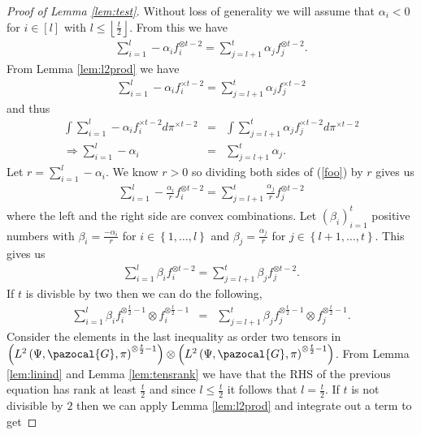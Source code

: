 \documentclass[aos]{imsart}
\def\l{\left}
\def\r{\right}
\def\sG{\pazocal{G}}
\theoremstyle{plain}
\theoremstyle{defintion}
\begin{document}
\begin{proof}[Proof of Lemma \ref{lem:test}]
		Without loss of generality we will assume that $\alpha_i<0$ for $i\in \left[ l \right]$ with $l\le \l\lfloor \frac{t}{2}\r\rfloor$. From this we have 
		\begin{eqnarray}\label{foo}
			\sum_{i=1}^{l}-\alpha_i f_i^{\otimes t-2}=\sum_{j=l+1}^{t}\alpha_j f_j^{\otimes t-2}.
		\end{eqnarray}
		From Lemma \ref{lem:l2prod} we have
		\begin{eqnarray*}
			\sum_{i=1}^{l}-\alpha_i f_i^{\times t-2}=\sum_{j=l+1}^{t}\alpha_j f_j^{\times t-2}
		\end{eqnarray*}
		and thus
		\begin{eqnarray*}
			\int \sum_{i=1}^{l}-\alpha_i f_i^{\times t-2} d\pi^{\times t-2 }&=&\int \sum_{j=l+1}^{t}\alpha_j f_j^{\times t-2}d\pi^{\times t-2 }\\
			\Rightarrow \sum_{i=1}^{l}-\alpha_i &=&\sum_{j=l+1}^{t}\alpha_j.
		\end{eqnarray*}
		Let $r=\sum_{i=1}^{l}-\alpha_i$. We know $r >0$ so dividing both sides of (\ref{foo}) by $r$ gives us
		\begin{eqnarray*}
			\sum_{i=1}^{l}-\frac{\alpha_i}{r} f_i^{\otimes t-2}=\sum_{j=l+1}^{t}\frac{\alpha_j}{r} f_j^{\otimes t-2}
		\end{eqnarray*}
		where the left and the right side are convex combinations. Let $\left( \beta_i \right)_{i=1}^{t}$ positive numbers with $\beta_i = \frac{-\alpha_i}{r}$ for $i \in \left\{ 1,\ldots,l \right\}$ and $\beta_j = \frac{\alpha_j}{r}$ for $j\in \left\{ l+1,\ldots,t \right\}$. This gives us
		\begin{eqnarray*}
			\sum_{i=1}^{l}\beta_i f_i^{\otimes t-2}=\sum_{j=l+1}^{t}\beta_j f_j^{\otimes t-2}.
		\end{eqnarray*}
		If $t$ is divisble by two then we can do the following,
		\begin{eqnarray*}
			\sum_{i=1}^{l} \beta_i f_i^{\otimes \frac{t}{2}-1}\otimes f_i^{\otimes \frac{t}{2}-1}&=&\sum_{j=l+1}^{t}\beta_j f_j^{\otimes \frac{t}{2}-1}\otimes f_j^{\otimes \frac{t}{2}-1}.
		\end{eqnarray*}
		Consider the elements in the last inequality as order two tensors in $\left( {L^2\left( \Psi, \sG, \pi \right)}^{\otimes \frac{t}{2}-1} \right)\otimes \left( {L^2\left( \Psi, \sG, \pi \right)}^{ \otimes \frac{t}{2}-1} \right)$. From Lemma \ref{lem:linind} and Lemma \ref{lem:tensrank} we have that the RHS of the previous equation has rank at least $\frac{t}{2}$ and since $l\le \frac{t}{2}$ it follows that $l=\frac{t}{2}$.
		If $t$ is not divisible by $2$ then we can apply Lemma \ref{lem:l2prod} and integrate out a term to get


\end{proof}
\end{document}
